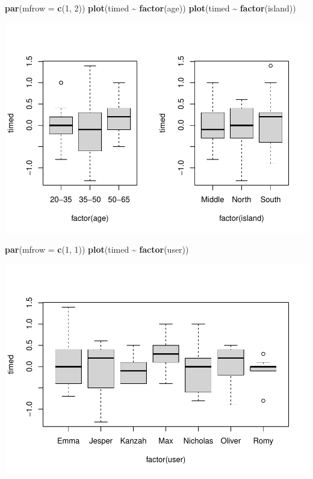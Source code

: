 \documentclass[
]{article}
\newenvironment{Shaded}{\begin{snugshade}}{\end{snugshade}}
\newcommand{\AttributeTok}[1]{\textcolor[rgb]{0.13,0.29,0.53}{#1}}
\newcommand{\DecValTok}[1]{\textcolor[rgb]{0.00,0.00,0.81}{#1}}
\newcommand{\FunctionTok}[1]{\textcolor[rgb]{0.13,0.29,0.53}{\textbf{#1}}}
\newcommand{\NormalTok}[1]{#1}
\newcommand{\SpecialCharTok}[1]{\textcolor[rgb]{0.81,0.36,0.00}{\textbf{#1}}}
\begin{document}
\begin{Shaded}
\begin{Highlighting}[]
\FunctionTok{par}\NormalTok{(}\AttributeTok{mfrow =} \FunctionTok{c}\NormalTok{(}\DecValTok{1}\NormalTok{, }\DecValTok{2}\NormalTok{))}
\FunctionTok{plot}\NormalTok{(timed }\SpecialCharTok{\textasciitilde{}} \FunctionTok{factor}\NormalTok{(age))}
\FunctionTok{plot}\NormalTok{(timed }\SpecialCharTok{\textasciitilde{}} \FunctionTok{factor}\NormalTok{(island))}
\end{Highlighting}
\end{Shaded}

\includegraphics{island_caffeine_files/figure-latex/basic plots-2.pdf}

\begin{Shaded}
\begin{Highlighting}[]
\FunctionTok{par}\NormalTok{(}\AttributeTok{mfrow =} \FunctionTok{c}\NormalTok{(}\DecValTok{1}\NormalTok{, }\DecValTok{1}\NormalTok{))}
\FunctionTok{plot}\NormalTok{(timed }\SpecialCharTok{\textasciitilde{}} \FunctionTok{factor}\NormalTok{(user))}
\end{Highlighting}
\end{Shaded}

\includegraphics{island_caffeine_files/figure-latex/basic plots-3.pdf}
\end{document}
